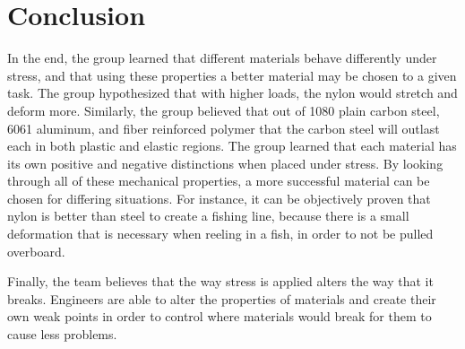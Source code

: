 \documentclass{article}
\begin{document}
\section{Conclusion}
In the end, the group learned that different materials behave differently under stress, and that using these properties a better material may be chosen to a given task. The group hypothesized that with higher loads, the nylon would stretch and deform more. Similarly, the group believed that out of 1080 plain carbon steel, 6061 aluminum, and fiber reinforced polymer that the carbon steel will outlast each in both plastic and elastic regions. The group learned that each material has its own positive and negative distinctions when placed under stress. By looking through all of these mechanical properties, a more successful material can be chosen for differing situations. For instance, it can be objectively proven that nylon is better than steel to create a fishing line, because there is a small deformation that is necessary when reeling in a fish, in order to not be pulled overboard. 
 
Finally, the team believes that the way stress is applied alters the way that it breaks. Engineers are able to alter the properties of materials and create their own weak points in order to control where materials would break for them to cause less problems. 
\end{document}
